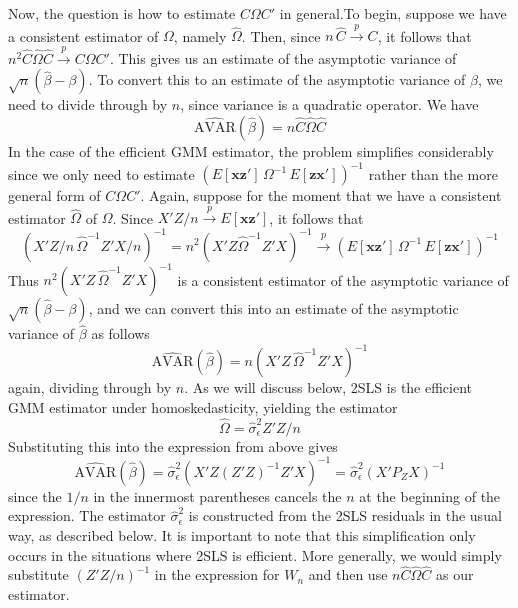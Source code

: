 \documentclass[12pt]{article}
\theoremstyle{definition}
\begin{document}
Now, the question is how to estimate $C\Omega C'$ in general.To begin, suppose we have a consistent estimator of $\Omega$, namely $\widehat{\Omega}$. Then, since $n\, \widehat{C} \overset{p}{\rightarrow} C$, it follows that $n^2 \widehat{C} \widehat{\Omega} \widehat{C}\overset{p}{\rightarrow}C\Omega C'$. This gives us an estimate of the asymptotic variance of $\sqrt{n}(\widehat{\beta} - \beta)$. To convert this to an estimate of the asymptotic variance of $\widehat{\beta}$, we need to divide through by $n$, since variance is a quadratic operator. We have
  $$\widehat{\mbox{AVAR}}(\widehat{\beta}) = n\widehat{C} \widehat{\Omega} \widehat{C}$$
In the case of the efficient GMM estimator, the problem simplifies considerably since we only need to estimate $ \left( E[\mathbf{x}\mathbf{z}']\, \Omega^{-1} \,E[\mathbf{z}\mathbf{x}'] \right)^{-1}$ rather than the more general form of $C\Omega C'$. Again, suppose for the moment that we have a consistent estimator $\widehat{\Omega}$ of $\Omega$. Since $X'Z/n \overset{p}{\rightarrow}E[\mathbf{x}\mathbf{z}']$, it follows that
  $$\left(X'Z/n  \,\widehat{\Omega}^{-1} Z'X/n\right)^{-1} = n^2 (X'Z \widehat{\Omega}^{-1} Z'X)^{-1} \overset{p}{\rightarrow}\left( E[\mathbf{x}\mathbf{z}']\, \Omega^{-1} \,E[\mathbf{z}\mathbf{x}'] \right)^{-1}$$
Thus $n^2\left(X'Z  \,\widehat{\Omega}^{-1} Z'X\right)^{-1}$ is a consistent estimator of the asymptotic variance of $\sqrt{n}(\widehat{\beta} - \beta)$, and we can convert this into an estimate of the asymptotic variance of $\widehat{\beta}$ as follows
  $$\widehat{\mbox{AVAR}}(\widehat{\beta}) = n \left(X'Z  \,\widehat{\Omega}^{-1} Z'X\right)^{-1} $$
again, dividing through by $n$. As we will discuss below, 2SLS is the efficient GMM estimator under homoskedasticity, yielding the estimator  
    $$\widehat{\Omega} = \widehat{\sigma}^2_\epsilon Z'Z/n$$
Substituting this into the expression from above gives
     $$\widehat{\mbox{AVAR}}(\widehat{\beta}) = \widehat{\sigma}^2_\epsilon \left(X'Z (Z'Z)^{-1} Z'X\right)^{-1}  = \widehat{\sigma}^2_\epsilon(X' P_Z X)^{-1}$$ 
since the $1/n$ in the innermost parentheses cancels the $n$ at the beginning of the expression. The estimator $\widehat{\sigma}^2_\epsilon$ is constructed from the 2SLS residuals in the usual way, as described below. It is important to note that this simplification only occurs in the situations where 2SLS is efficient. More generally, we would simply substitute $(Z'Z/n)^{-1}$ in the expression for $W_n$ and then use $n\widehat{C} \widehat{\Omega} \widehat{C}$ as our estimator.
\end{document}
